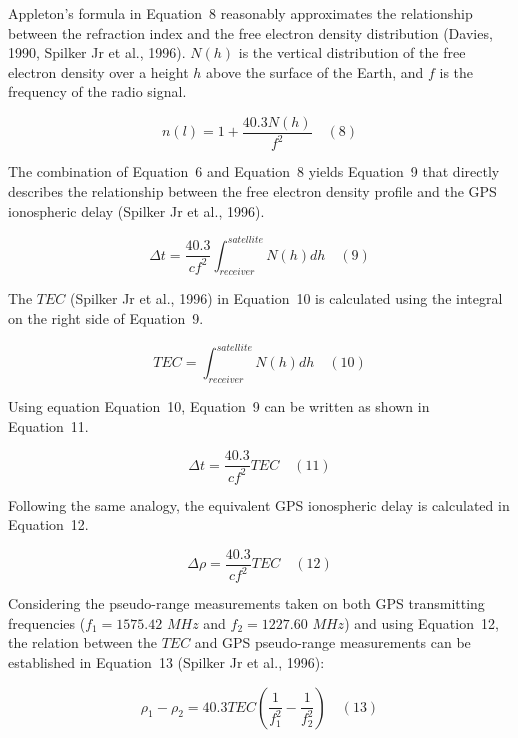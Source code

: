 \documentclass[sn-mathphys-num]{sn-jnl}%
\begin{document}
Appleton’s formula in Equation~8 reasonably approximates the relationship between the refraction index and the free electron density distribution (Davies, 1990, Spilker Jr et al., 1996). $N(h)$ is the vertical distribution of the free electron density over a height $h$ above the surface of the Earth, and $f$ is the frequency of the radio signal.

\begin{equation}
	n(l) = 1 + \frac{40.3 N(h)}{f^{2}}
	\quad\left(8\right)
\end{equation}

The combination of Equation~6 and Equation~8 yields Equation~9 that directly describes the relationship between the free electron density profile and the GPS ionospheric delay (Spilker Jr et al., 1996).

\begin{equation}
	\Delta t = \frac{40.3}{c f^{2}} \int_{receiver}^{satellite} N(h)dh
	\quad\left(9\right)
\end{equation}

The $TEC$ (Spilker Jr et al., 1996) in Equation~10 is calculated using the integral on the right side of Equation~9.

\begin{equation}
	TEC = \int_{receiver}^{satellite} N(h)dh
	\quad\left(10\right)
\end{equation}

Using equation Equation~10, Equation~9 can be written as shown in Equation~11.

\begin{equation}
	\Delta t = \frac{40.3}{c f^{2}} TEC
	\quad\left(11\right)
\end{equation}

Following the same analogy, the equivalent GPS ionospheric delay is calculated in Equation~12.

\begin{equation}
	\Delta \rho = \frac{40.3}{c f^{2}} TEC
	\quad\left(12\right)
\end{equation}

Considering the pseudo-range measurements taken on both GPS transmitting frequencies ($f_{1}=1575.42$ $MHz$ and $f_{2}=1227.60$ $MHz$) and using Equation~12, the relation between the $TEC$ and GPS pseudo-range measurements can be established in Equation~13 (Spilker Jr et al., 1996):
 
\begin{equation}
	\rho_{1} - \rho_{2} = 40.3 TEC \left( \frac{1}{f_{1}^{2}} - \frac{1}{f_{2}^{2}} \right)
	\quad\left(13\right)
\end{equation}
\end{document}
